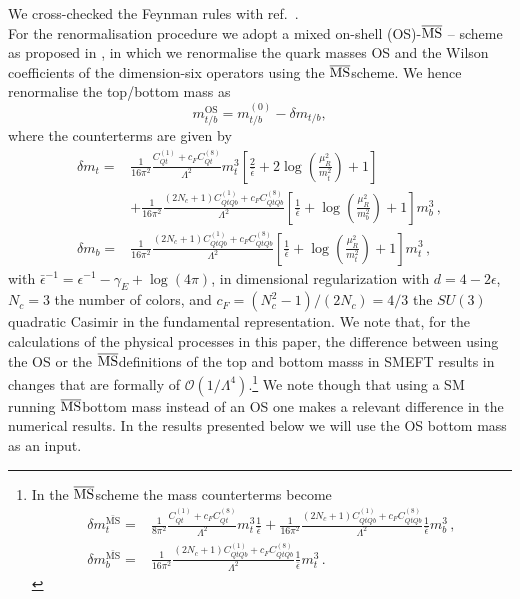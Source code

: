 We cross-checked the Feynman rules with ref.~\cite{Dedes:2017zog}.
\\
For the renormalisation procedure we adopt a mixed on-shell (OS)-$\overline{\mathrm{MS}}$ -- scheme as proposed in \cite{Dawson:2018pyl}, in which we renormalise 
the quark masses OS and the Wilson coefficients of the dimension-six operators using  the $\overline{\mathrm{MS}}$\;scheme. 
We hence renormalise the top/bottom mass as
\begin{equation}
	m_{t/b}^{\text{OS}}=m_{t/b}^{(0)}-\delta m_{t/b},
\end{equation}
%
where the counterterms are given by
\begin{align}
	\delta m_t =&\frac{1}{16 \pi^2} \frac{C_{Qt}^{(1)}+c_F C_{Qt}^{(8)}}{\Lambda^2}m_t^3\left[ \frac{2}{\bar{\epsilon}} +2 \log\left(\frac{\mu_R^2}{m_t^2}\right)+1\right] \\ &+ \frac{1}{16 \pi^2}  \frac{(2 N_c+1) C_{QtQb}^{(1)}+c_F C_{QtQb}^{(8)}}{\Lambda^2}  \left[ \frac{1}{\bar{\epsilon}} +  \log\left(\frac{\mu_R^2}{m_b^2}\right)+1 \right]  m_b^3\,, \nonumber \\
	\delta m_b=&\frac{1}{16 \pi^2} \frac{(2 N_c+1)C_{QtQb}^{(1)}+c_F C_{QtQb}^{(8)}}{\Lambda^2}\left[ \frac{1}{\bar{\epsilon}} +\log\left( \frac{\mu_R^2}{m_t^2}\right)+1\right] m_t^3\,,
\end{align}
with $\bar{\epsilon}^{-1} = \epsilon^{-1}- \gamma_E +\log(4 \pi)$, in dimensional regularization with $d=4-2\epsilon$, $N_c=3$ the number of colors, and $c_F=(N_c^2-1)/(2N_c)=4/3$ the $SU(3)$ quadratic Casimir in the fundamental representation. 
We note that, for the calculations of the physical processes in this paper, the difference between using the OS or the $\overline{\mathrm{MS}}$\;definitions of the top and bottom masss in SMEFT results in changes that are formally of $\mathcal{O}(1/\Lambda^4)$.\footnote{In the $\overline{\mathrm{MS}}$\;scheme the mass counterterms become
	\begin{align}
		\delta m_t^{\bar{\text{MS}}} =&\frac{1}{8 \pi^2} \frac{C_{Qt}^{(1)}+c_F C_{Qt}^{(8)}}{\Lambda^2}m_t^3\frac{1}{\bar{\epsilon}}+ \frac{1}{16 \pi^2}  \frac{(2 N_c+1) C_{QtQb}^{(1)}+c_F C_{QtQb}^{(8)}}{\Lambda^2}   \frac{1}{\bar{\epsilon}}  m_b^3\,,  \\
		\delta m_b^{\bar{\text{MS}}}=&\frac{1}{16 \pi^2} \frac{(2 N_c+1)C_{QtQb}^{(1)}+c_F C_{QtQb}^{(8)}}{\Lambda^2}\frac{1}{\bar{\epsilon}} m_t^3\,.
	\end{align}
}
We note though that using a SM running $\overline{\mathrm{MS}}$\;bottom mass instead of an OS one makes a relevant difference in the numerical results.
In the results presented below we will use the OS bottom mass as an input.

